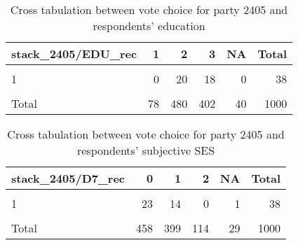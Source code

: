 \documentclass[
]{article}
\begin{document}
\begin{table}

\caption{\label{tab:unnamed-chunk-166}Cross tabulation between vote choice for party 2405 and respondents' education
                   \label{table:crosstab_1_si}}
\centering
\begin{tabular}[t]{l|r|r|r|r|r}
\hline
stack\_2405/EDU\_rec & 1 & 2 & 3 & NA & Total\\
\hline
\cellcolor{gray!6}{0} & \cellcolor{gray!6}{76} & \cellcolor{gray!6}{446} & \cellcolor{gray!6}{380} & \cellcolor{gray!6}{40} & \cellcolor{gray!6}{942}\\
\hline
1 & 0 & 20 & 18 & 0 & 38\\
\hline
\cellcolor{gray!6}{NA} & \cellcolor{gray!6}{2} & \cellcolor{gray!6}{14} & \cellcolor{gray!6}{4} & \cellcolor{gray!6}{0} & \cellcolor{gray!6}{20}\\
\hline
Total & 78 & 480 & 402 & 40 & 1000\\
\hline
\end{tabular}
\end{table}

\begin{table}

\caption{\label{tab:unnamed-chunk-166}Cross tabulation between vote choice for party 2405 and respondents' subjective SES
                   \label{table:crosstab_2_si}}
\centering
\begin{tabular}[t]{l|r|r|r|r|r}
\hline
stack\_2405/D7\_rec & 0 & 1 & 2 & NA & Total\\
\hline
\cellcolor{gray!6}{0} & \cellcolor{gray!6}{425} & \cellcolor{gray!6}{379} & \cellcolor{gray!6}{110} & \cellcolor{gray!6}{28} & \cellcolor{gray!6}{942}\\
\hline
1 & 23 & 14 & 0 & 1 & 38\\
\hline
\cellcolor{gray!6}{NA} & \cellcolor{gray!6}{10} & \cellcolor{gray!6}{6} & \cellcolor{gray!6}{4} & \cellcolor{gray!6}{0} & \cellcolor{gray!6}{20}\\
\hline
Total & 458 & 399 & 114 & 29 & 1000\\
\hline
\end{tabular}
\end{table}
\end{document}
